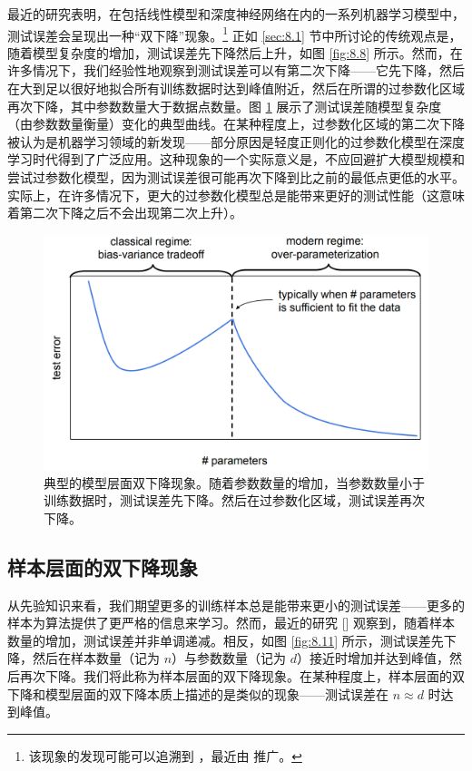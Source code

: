 最近的研究表明，在包括线性模型和深度神经网络在内的一系列机器学习模型中，测试误差会呈现出一种“双下降”现象。\footnote{该现象的发现可能可以追溯到 \cite{opper1995statistical,opper2001learning}，最近由 \cite{belkin2020two,hastie2022surprises} 推广。} 正如 \ref{sec:8.1} 节中所讨论的传统观点是，随着模型复杂度的增加，测试误差先下降然后上升，如图 \ref{fig:8.8} 所示。然而，在许多情况下，我们经验性地观察到测试误差可以有第二次下降——它先下降，然后在大到足以很好地拟合所有训练数据时达到峰值附近，然后在所谓的过参数化区域再次下降，其中参数数量大于数据点数量。图 \ref{fig:8.10} 展示了测试误差随模型复杂度（由参数数量衡量）变化的典型曲线。在某种程度上，过参数化区域的第二次下降被认为是机器学习领域的新发现——部分原因是轻度正则化的过参数化模型在深度学习时代得到了广泛应用。这种现象的一个实际意义是，不应回避扩大模型规模和尝试过参数化模型，因为测试误差很可能再次下降到比之前的最低点更低的水平。实际上，在许多情况下，更大的过参数化模型总是能带来更好的测试性能（这意味着第二次下降之后不会出现第二次上升）。

\begin{figure}[H]
    \centering
    \includegraphics[width=0.8\linewidth]{figs/double_descent.png}
    \caption{典型的模型层面双下降现象。随着参数数量的增加，当参数数量小于训练数据时，测试误差先下降。然后在过参数化区域，测试误差再次下降。}
    \label{fig:8.10}
\end{figure}

\subsection*{样本层面的双下降现象}

从先验知识来看，我们期望更多的训练样本总是能带来更小的测试误差——更多的样本为算法提供了更严格的信息来学习。然而，最近的研究 [\cite{nakkiran2019more}] 观察到，随着样本数量的增加，测试误差并非单调递减。相反，如图 \ref{fig:8.11} 所示，测试误差先下降，然后在样本数量（记为 $n$）与参数数量（记为 $d$）接近时增加并达到峰值，然后再次下降。我们将此称为样本层面的双下降现象。在某种程度上，样本层面的双下降和模型层面的双下降本质上描述的是类似的现象——测试误差在 $n \approx d$ 时达到峰值。

